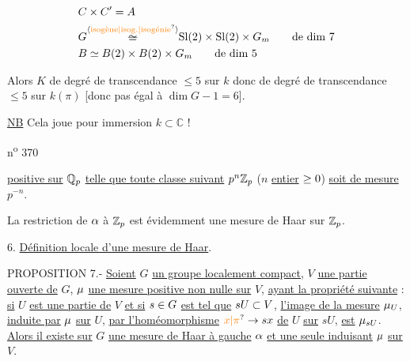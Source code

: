 \[
\begin{aligned}
&C\times C'=A\\
&G\overset{\inserted{\text{\unsure{isogène|isog.|isogénie}}}}{\deleted{\simeq}}\mathrm{Sl}(2)\times\mathrm{Sl}(2)\times G_m\qquad\text{de dim }7\\
&B\simeq B(2)\times B(2)\times G_m\qquad\text{de dim }5
\end{aligned}
\]

Alors $K$ de degré de transcendance $\leq5$ sur $k$
donc de degré de transcendance $\leq5$ sur $k(\pi)$
[donc pas égal à $\dim G-1=6$].

\uline{NB} Cela joue pour \uline{} immersion $k\subset\mathbb C$ !

n\textsuperscript{o} 370

\uline{positive sur} $\mathbb{Q}_p$ \uline{telle que toute classe suivant} $p^n\mathbb{Z}_p$ ($n$ \uline{entier} $\geq0$) \uline{soit de mesure} $p^{-n}$.

La restriction de $\alpha$ à $\mathbb{Z}_p$ est évidemment une mesure de Haar sur $\mathbb{Z}_p$.

6. \uline{Définition locale d'une mesure de Haar}.

PROPOSITION 7.- \uline{Soient} $G$ \uline{un groupe localement compact}, $V$ \uline{une partie ouverte de} $G$,
$\mu$ \uline{une mesure positive non nulle sur} $V$, \uline{ayant la propriété suivante} : \uline{si} $U$ \uline{est une
partie  de} $V$ \uline{et si} $s\in G$ \uline{est tel que} $sU\subset V$, \uline{l'image de la mesure} $\mu_U$,
\uline{induite par} $\mu$ \uline{sur} $U$, \uline{par l'homéomorphisme} $\unsure{x|\pi}\to sx$ \uline{de} $U$ \uline{sur} $sU$, \uline{est} $\mu_{sU}$. \uline{Alors il
existe sur} $G$ \uline{une mesure de Haar à gauche} $\alpha$ \uline{et une seule induisant} $\mu$ \uline{sur} $V$.

